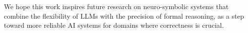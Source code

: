 We hope this work inspires future research on neuro-symbolic systems that combine the flexibility of LLMs with the precision of formal reasoning, as a step toward more reliable AI systems for domains where correctness is crucial.




